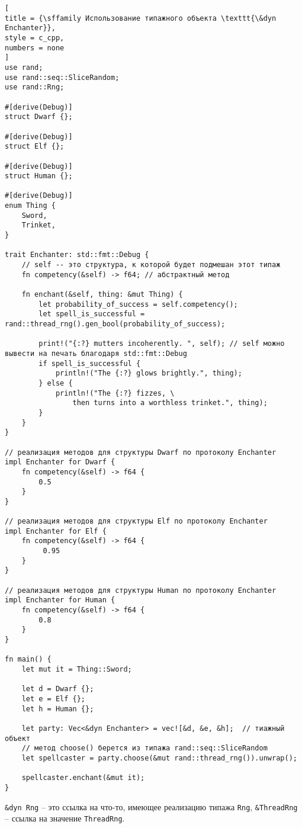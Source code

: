 \documentclass[%
	11pt,
	a4paper,
	utf8,
		]{article}
\begin{document}
\begin{lstlisting}[
title = {\sffamily Использование типажного объекта \texttt{\&dyn Enchanter}},
style = c_cpp,
numbers = none
]
use rand;
use rand::seq::SliceRandom;
use rand::Rng;

#[derive(Debug)]
struct Dwarf {};

#[derive(Debug)]
struct Elf {};

#[derive(Debug)]
struct Human {};

#[derive(Debug)]
enum Thing {
    Sword,
    Trinket,
}

trait Enchanter: std::fmt::Debug {
	// self -- это структура, к которой будет подмешан этот типаж
    fn competency(&self) -> f64; // абстрактный метод
    
    fn enchant(&self, thing: &mut Thing) {
        let probability_of_success = self.competency();
        let spell_is_successful = rand::thread_rng().gen_bool(probability_of_success);
        
        print!("{:?} mutters incoherently. ", self); // self можно вывести на печать благодаря std::fmt::Debug
        if spell_is_successful {
            println!("The {:?} glows brightly.", thing);
        } else {
            println!("The {:?} fizzes, \
                then turns into a worthless trinket.", thing);
        }
    }
}

// реализация методов для структуры Dwarf по протоколу Enchanter
impl Enchanter for Dwarf {
    fn competency(&self) -> f64 {
        0.5
    }
}

// реализация методов для структуры Elf по протоколу Enchanter
impl Enchanter for Elf {
    fn competency(&self) -> f64 {
         0.95
    }
}

// реализация методов для структуры Human по протоколу Enchanter
impl Enchanter for Human {
    fn competency(&self) -> f64 {
        0.8
    }
}

fn main() {
    let mut it = Thing::Sword;
    
    let d = Dwarf {};
    let e = Elf {};
    let h = Human {};
    
    let party: Vec<&dyn Enchanter> = vec![&d, &e, &h];  // тиажный объект
    // метод choose() берется из типажа rand::seq::SliceRandom
    let spellcaster = party.choose(&mut rand::thread_rng()).unwrap();
    
    spellcaster.enchant(&mut it);
}
\end{lstlisting}

\verb|&dyn Rng| -- это ссылка на что-то, имеющее реализацию типажа \verb|Rng|, \verb|&ThreadRng| -- ссылка на значение \verb|ThreadRng|.
\end{document}
